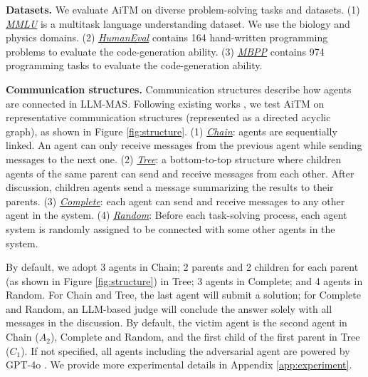 
\noindent\textbf{Datasets.} 
We evaluate AiTM on diverse problem-solving tasks and datasets. (1) \underline{\textit{MMLU}} \citep{hendrycks2020measuring} is a multitask language understanding dataset. We use the biology and physics domains. (2) \underline{\textit{HumanEval}} \citep{chen2021evaluating} contains 164 hand-written programming problems to evaluate the code-generation ability. (3) \underline{\textit{MBPP}} \citep{austin2021program} contains 974 programming tasks to evaluate the code-generation ability. 

\noindent\textbf{Communication structures.} Communication structures describe how agents are connected in LLM-MAS. Following existing works \citep{yu2024netsafe, qian2024scaling}, we test AiTM on representative communication structures (represented as a directed acyclic graph), as shown in Figure \ref{fig:structure}. (1) \underline{\textit{Chain}}: agents are sequentially linked. An agent can only receive messages from the previous agent while sending messages to the next one. (2) \underline{\textit{Tree}}: a bottom-to-top structure where children agents of the same parent can send and receive messages from each other. After discussion, children agents send a message summarizing the results to their parents. (3) \underline{\textit{Complete}}: each agent can send and receive messages to any other agent in the system. (4) \underline{\textit{Random}}: Before each task-solving process, each agent system is randomly assigned to be connected with some other agents in the system.

By default, we adopt 3 agents in Chain; 2 parents and 2 children for each parent (as shown in Figure \ref{fig:structure}) in Tree; 3 agents in Complete; and 4 agents in Random. For Chain and Tree, the last agent will submit a solution; for Complete and Random, an LLM-based judge will conclude the answer solely with all messages in the discussion. By default, the victim agent is the second agent in Chain ($A_2$), Complete and Random, and the first child of the first parent in Tree ($C_1$). If not specified, all agents including the adversarial agent are powered by GPT-4o \citep{achiam2023gpt}. We provide more experimental details in Appendix \ref{app:experiment}. 

